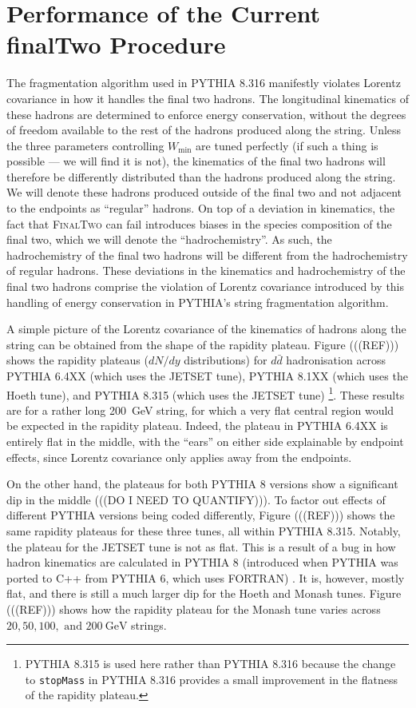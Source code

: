 \documentclass[12pt,a4paper]{report}
\begin{document}
\section{Performance of the Current finalTwo Procedure}
The fragmentation algorithm used in PYTHIA 8.316 manifestly violates Lorentz covariance in how it handles the final two hadrons. The longitudinal kinematics of these hadrons are determined to enforce energy conservation, without the degrees of freedom available to the rest of the hadrons produced along the string. Unless the three parameters controlling $W_\text{min}$ are tuned perfectly (if such a thing is possible --- we will find it is not), the kinematics of the final two hadrons will therefore be differently distributed than the hadrons produced along the string. We will denote these hadrons produced outside of the final two and not adjacent to the endpoints as ``regular'' hadrons. On top of a deviation in kinematics, the fact that \textsc{FinalTwo} can fail introduces biases in the species composition of the final two, which we will denote the ``hadrochemistry''. As such, the hadrochemistry of the final two hadrons will be different from the hadrochemistry of regular hadrons. These deviations in the kinematics and hadrochemistry of the final two hadrons comprise the violation of Lorentz covariance introduced by this handling of energy conservation in PYTHIA's string fragmentation algorithm.

A simple picture of the Lorentz covariance of the kinematics of hadrons along the string can be obtained from the shape of the rapidity plateau. Figure (((REF))) shows the rapidity plateaus ($dN/dy$ distributions) for $d\bar{d}$ hadronisation across PYTHIA 6.4XX (which uses the JETSET tune), PYTHIA 8.1XX (which uses the Hoeth tune), and PYTHIA 8.315 (which uses the JETSET tune) \footnote{PYTHIA 8.315 is used here rather than PYTHIA 8.316 because the change to \texttt{stopMass} in PYTHIA 8.316 provides a small improvement in the flatness of the rapidity plateau.}. These results are for a rather long \qty{200}{\giga\electronvolt} string, for which a very flat central region would be expected in the rapidity plateau. Indeed, the plateau in PYTHIA 6.4XX is entirely flat in the middle, with the ``ears'' on either side explainable by endpoint effects, since Lorentz covariance only applies away from the endpoints.

On the other hand, the plateaus for both PYTHIA 8 versions show a significant dip in the middle (((DO I NEED TO QUANTIFY))). To factor out effects of different PYTHIA versions being coded differently, Figure (((REF))) shows the same rapidity plateaus for these three tunes, all within PYTHIA 8.315. Notably, the plateau for the JETSET tune is not as flat. This is a result of a bug in how hadron kinematics are calculated in PYTHIA 8 (introduced when PYTHIA was ported to C++ from PYTHIA 6, which uses FORTRAN) \cite{steve}. It is, however, mostly flat, and there is still a much larger dip for the Hoeth and Monash tunes. Figure (((REF))) shows how the rapidity plateau for the Monash tune varies across $20, 50, 100,\text{ and } \qty{200}{\giga\electronvolt}$ strings.
\end{document}
